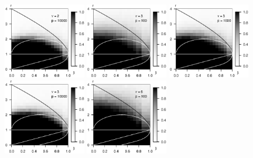 \begin{figure}
      \includegraphics[width=0.32\textwidth]{sim_approx-exact_boundary/simulated_approx-exact_boundary_chi-squared_nu2_p10000.eps}
      \includegraphics[width=0.32\textwidth]{sim_approx-exact_boundary/simulated_approx-exact_boundary_chi-squared_nu3_p100.eps}
      \includegraphics[width=0.32\textwidth]{sim_approx-exact_boundary/simulated_approx-exact_boundary_chi-squared_nu3_p1000.eps}
      \includegraphics[width=0.32\textwidth]{sim_approx-exact_boundary/simulated_approx-exact_boundary_chi-squared_nu3_p10000.eps}
      \includegraphics[width=0.32\textwidth]{sim_approx-exact_boundary/simulated_approx-exact_boundary_chi-squared_nu6_p100.eps}

\end{figure}
